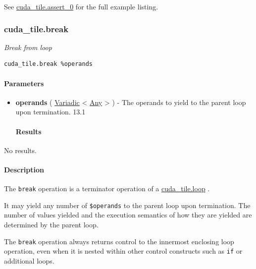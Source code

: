 \documentclass{article}
\begin{document}
See \href{https://docs.nvidia.com/cuda/tile-ir/latest/sections/appendix.html#example-cuda-tile-assert-0}{cuda\_tile.assert\_0} for the full example listing.



\subsubsection{cuda\_tile.break}

\textit{Break from loop}


\begin{lstlisting}
cuda_tile.break %operands
\end{lstlisting}

\paragraph{Parameters}

\begin{itemize}
\item \textbf{operands} ( \href{https://docs.nvidia.com/cuda/tile-ir/latest/sections/operations.html#type-variadic}{Variadic} < \href{https://docs.nvidia.com/cuda/tile-ir/latest/sections/operations.html#type-any}{Any} > ) - The operands to yield to the parent loop upon termination. 13.1


\paragraph{Results}

\end{itemize}
No results.



\paragraph{Description}

The \texttt{break} operation is a terminator operation of a \href{https://docs.nvidia.com/cuda/tile-ir/latest/sections/operations.html#op-cuda-tile-loop}{cuda\_tile.loop} .


It may yield any number of \texttt{\$operands} to the parent loop upon termination. The number of values yielded and the execution semantics of how they are yielded are determined by the parent loop.


The \texttt{break} operation always returns control to the innermost enclosing loop operation, even when it is nested within other control constructs such as \texttt{if} or additional loops.
\end{document}

